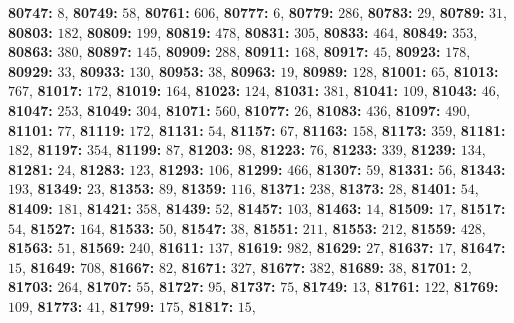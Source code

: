 \textsf{\bfseries 80747:} $8$, \textsf{\bfseries 80749:} $58$, \textsf{\bfseries 80761:} $606$, \textsf{\bfseries 80777:} $6$, \textsf{\bfseries 80779:} $286$, \textsf{\bfseries 80783:} $29$, \textsf{\bfseries 80789:} $31$, \textsf{\bfseries 80803:} $182$, \textsf{\bfseries 80809:} $199$, \textsf{\bfseries 80819:} $478$, \textsf{\bfseries 80831:} $305$, \textsf{\bfseries 80833:} $464$, \textsf{\bfseries 80849:} $353$, \textsf{\bfseries 80863:} $380$, \textsf{\bfseries 80897:} $145$, \textsf{\bfseries 80909:} $288$, \textsf{\bfseries 80911:} $168$, \textsf{\bfseries 80917:} $45$, \textsf{\bfseries 80923:} $178$, \textsf{\bfseries 80929:} $33$, \textsf{\bfseries 80933:} $130$, \textsf{\bfseries 80953:} $38$, \textsf{\bfseries 80963:} $19$, \textsf{\bfseries 80989:} $128$, \textsf{\bfseries 81001:} $65$, \textsf{\bfseries 81013:} $767$, \textsf{\bfseries 81017:} $172$, \textsf{\bfseries 81019:} $164$, \textsf{\bfseries 81023:} $124$, \textsf{\bfseries 81031:} $381$, \textsf{\bfseries 81041:} $109$, \textsf{\bfseries 81043:} $46$, \textsf{\bfseries 81047:} $253$, \textsf{\bfseries 81049:} $304$, \textsf{\bfseries 81071:} $560$, \textsf{\bfseries 81077:} $26$, \textsf{\bfseries 81083:} $436$, \textsf{\bfseries 81097:} $490$, \textsf{\bfseries 81101:} $77$, \textsf{\bfseries 81119:} $172$, \textsf{\bfseries 81131:} $54$, \textsf{\bfseries 81157:} $67$, \textsf{\bfseries 81163:} $158$, \textsf{\bfseries 81173:} $359$, \textsf{\bfseries 81181:} $182$, \textsf{\bfseries 81197:} $354$, \textsf{\bfseries 81199:} $87$, \textsf{\bfseries 81203:} $98$, \textsf{\bfseries 81223:} $76$, \textsf{\bfseries 81233:} $339$, \textsf{\bfseries 81239:} $134$, \textsf{\bfseries 81281:} $24$, \textsf{\bfseries 81283:} $123$, \textsf{\bfseries 81293:} $106$, \textsf{\bfseries 81299:} $466$, \textsf{\bfseries 81307:} $59$, \textsf{\bfseries 81331:} $56$, \textsf{\bfseries 81343:} $193$, \textsf{\bfseries 81349:} $23$, \textsf{\bfseries 81353:} $89$, \textsf{\bfseries 81359:} $116$, \textsf{\bfseries 81371:} $238$, \textsf{\bfseries 81373:} $28$, \textsf{\bfseries 81401:} $54$, \textsf{\bfseries 81409:} $181$, \textsf{\bfseries 81421:} $358$, \textsf{\bfseries 81439:} $52$, \textsf{\bfseries 81457:} $103$, \textsf{\bfseries 81463:} $14$, \textsf{\bfseries 81509:} $17$, \textsf{\bfseries 81517:} $54$, \textsf{\bfseries 81527:} $164$, \textsf{\bfseries 81533:} $50$, \textsf{\bfseries 81547:} $38$, \textsf{\bfseries 81551:} $211$, \textsf{\bfseries 81553:} $212$, \textsf{\bfseries 81559:} $428$, \textsf{\bfseries 81563:} $51$, \textsf{\bfseries 81569:} $240$, \textsf{\bfseries 81611:} $137$, \textsf{\bfseries 81619:} $982$, \textsf{\bfseries 81629:} $27$, \textsf{\bfseries 81637:} $17$, \textsf{\bfseries 81647:} $15$, \textsf{\bfseries 81649:} $708$, \textsf{\bfseries 81667:} $82$, \textsf{\bfseries 81671:} $327$, \textsf{\bfseries 81677:} $382$, \textsf{\bfseries 81689:} $38$, \textsf{\bfseries 81701:} $2$, \textsf{\bfseries 81703:} $264$, \textsf{\bfseries 81707:} $55$, \textsf{\bfseries 81727:} $95$, \textsf{\bfseries 81737:} $75$, \textsf{\bfseries 81749:} $13$, \textsf{\bfseries 81761:} $122$, \textsf{\bfseries 81769:} $109$, \textsf{\bfseries 81773:} $41$, \textsf{\bfseries 81799:} $175$, \textsf{\bfseries 81817:} $15$, 
